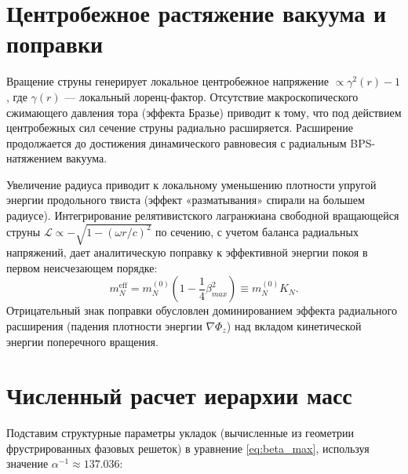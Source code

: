 \documentclass[12pt,a4paper]{article}
\begin{document}
\section{Центробежное растяжение вакуума и поправки}

Вращение струны генерирует локальное центробежное напряжение $\propto \gamma^2(r) - 1$, где $\gamma(r)$ — локальный лоренц-фактор. Отсутствие макроскопического сжимающего давления тора (эффекта Бразье) приводит к тому, что под действием центробежных сил сечение струны радиально расширяется.
Расширение продолжается до достижения динамического равновесия с радиальным BPS-натяжением вакуума.

Увеличение радиуса приводит к локальному уменьшению плотности упругой энергии продольного твиста (эффект «разматывания» спирали на большем радиусе). Интегрирование релятивистского лагранжиана свободной вращающейся струны $\mathcal{L} \propto -\sqrt{1 - (\omega r/c)^2}$ по сечению, с учетом баланса радиальных напряжений, дает аналитическую поправку к эффективной энергии покоя в первом неисчезающем порядке:
\begin{equation}
m_N^{\text{eff}} = m_N^{(0)} \left( 1 - \frac{1}{4} \beta_{max}^2 \right) \equiv m_N^{(0)} K_N.
\label{eq:mass_correction}
\end{equation}
Отрицательный знак поправки обусловлен доминированием эффекта радиального расширения (падения плотности энергии $\nabla \Phi_z$) над вкладом кинетической энергии поперечного вращения.

\section{Численный расчет иерархии масс}

Подставим структурные параметры укладок (вычисленные из геометрии фрустрированных фазовых решеток) в уравнение \eqref{eq:beta_max}, используя значение $\alpha^{-1} \approx 137.036$:
\end{document}

